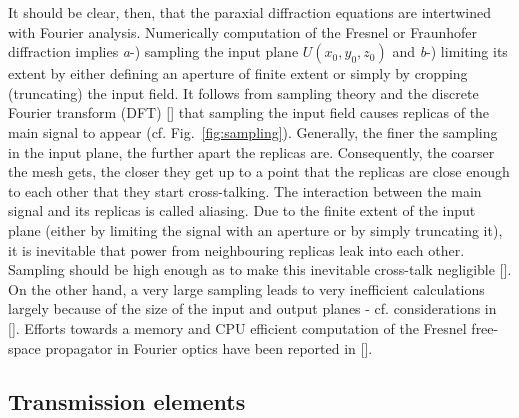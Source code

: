 \begin{refsection}
It should be clear, then, that the paraxial diffraction equations are intertwined with Fourier analysis. Numerically computation of the Fresnel or Fraunhofer diffraction implies \textit{a}-) sampling the input plane $U(x_0,y_0,z_0)$ and \textit{b}-) limiting its extent by either defining an aperture of finite extent or simply by cropping (truncating) the input field. It follows from sampling theory and the discrete Fourier transform (DFT) [\cite[\textit{§10}~\&~\textit{§11}]{Bracewell2000}] that sampling the input field causes replicas of the main signal to appear (cf. Fig.~\ref{fig:sampling}). Generally, the finer the sampling in the input plane, the further apart the replicas are. Consequently, the coarser the mesh gets, the closer they get up to a point that the replicas are close enough to each other that they start cross-talking. The interaction between the main signal and its replicas is called aliasing. Due to the finite extent of the input plane (either by limiting the signal with an aperture or by simply truncating it), it is inevitable that power from neighbouring replicas leak into each other. Sampling should be high enough as to make this inevitable cross-talk negligible [\cite{Kelly2014}]. On the other hand, a very large sampling leads to very inefficient calculations largely because of the size of the input and output planes - cf. considerations in [\cite[\textit{§5}]{Goodman2015}]. Efforts towards a memory and CPU efficient computation of the Fresnel free-space propagator in Fourier optics have been reported in [\cite{Chubar2019}].

\subsection{Transmission elements}\label{sec:thin_element}


\end{refsection}

